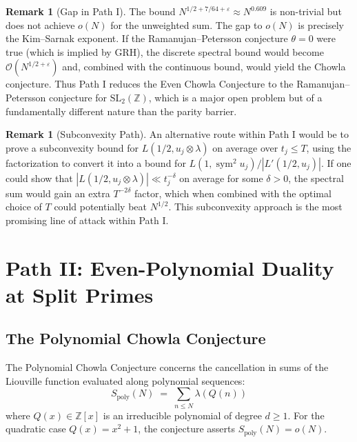\documentclass[11pt,a4paper]{article}
\theoremstyle{plain}
\theoremstyle{definition}
\newtheorem{remark}[theorem]{Remark}
\newcommand{\SL}{\mathrm{SL}_2}
\newcommand{\sym}{\operatorname{sym}}
\begin{document}
\begin{remark}[Gap in Path I]
The bound $N^{1/2 + 7/64 + \varepsilon} \approx N^{0.609}$ is non-trivial but does not achieve $o(N)$ for the unweighted sum. The gap to $o(N)$ is precisely the Kim--Sarnak exponent. If the Ramanujan--Petersson conjecture $\theta = 0$ were true (which is implied by GRH), the discrete spectral bound would become $\mathcal{O}(N^{1/2+\varepsilon})$ and, combined with the continuous bound, would yield the Chowla conjecture. Thus Path I reduces the Even Chowla Conjecture to the Ramanujan--Petersson conjecture for $\SL(\mathbb{Z})$, which is a major open problem but of a fundamentally different nature than the parity barrier.
\end{remark}

\begin{remark}[Subconvexity Path]
An alternative route within Path I would be to prove a subconvexity bound for $L(1/2, u_j \otimes \lambda)$ on average over $t_j \leq T$, using the factorization to convert it into a bound for $L(1, \sym^2 u_j)/|L'(1/2, u_j)|$. If one could show that $|L(1/2, u_j \otimes \lambda)| \ll t_j^{-\delta}$ on average for some $\delta > 0$, the spectral sum would gain an extra $T^{-2\delta}$ factor, which when combined with the optimal choice of $T$ could potentially beat $N^{1/2}$. This subconvexity approach is the most promising line of attack within Path I.
\end{remark}

\section{Path II: Even-Polynomial Duality at Split Primes}

\subsection{The Polynomial Chowla Conjecture}

The Polynomial Chowla Conjecture concerns the cancellation in sums of the Liouville function evaluated along polynomial sequences:
\begin{equation}\label{eq:poly-chowla}
S_{\mathrm{poly}}(N) \;=\; \sum_{n \leq N} \lambda(Q(n))
\end{equation}
where $Q(x) \in \mathbb{Z}[x]$ is an irreducible polynomial of degree $d \geq 1$. For the quadratic case $Q(x) = x^2 + 1$, the conjecture asserts $S_{\mathrm{poly}}(N) = o(N)$.
\end{document}
